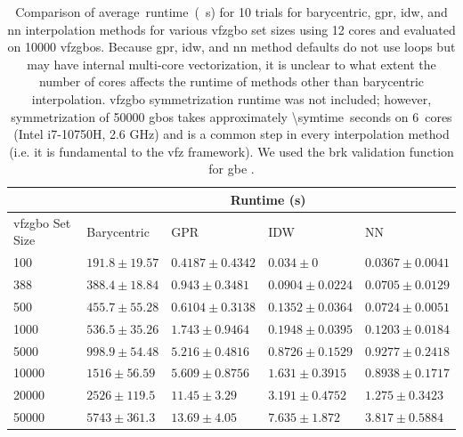 \documentclass[final,twocolumn,12pt]{elsarticle}
\begin{document}
\begin{table}
\centering
\caption{Comparison of average~runtime~(\SI{}{\second}) for \num{10} trials for barycentric, \gls{gpr}, \gls{idw}, and \gls{nn} interpolation methods for various \inpt{} \gls{vfzgbo} set sizes using 12 cores and evaluated on \num{10000} \outpt{} \glspl{vfzgbo}. Because \gls{gpr}, \gls{idw}, and \gls{nn} method defaults do not use  loops but may have internal multi-core vectorization, it is unclear to what extent the number of cores affects the runtime of methods other than barycentric interpolation. \Gls{vfzgbo} symmetrization runtime was not included; however, symmetrization of \num{50000} \glspl{gbo} takes approximately \SI{\symtime}{seconds} on \SI{6}{cores} (Intel i7-10750H, 2.6 GHz) and is a common step in every interpolation method (i.e. it is fundamental to the \gls{vfz} framework). We used the \gls{brk} validation function for \gls{gbe} \cite{bulatovGrainBoundaryEnergy2014}. }
\label{tab:runtime}
\begin{tabular}{lllll}
\cline{2-5}
                    & \multicolumn{4}{c}{Runtime (s)}                                                     \\ \hline
\gls{vfzgbo} Set Size & Barycentric       & GPR                 & IDW                 & NN                  \\ \hline
\num{100}           & $191.8 \pm 19.57$ & $0.4187 \pm 0.4342$ & $0.034 \pm 0$       & $0.0367 \pm 0.0041$ \\
\num{388}           & $388.4 \pm 18.84$ & $0.943 \pm 0.3481$  & $0.0904 \pm 0.0224$ & $0.0705 \pm 0.0129$ \\
\num{500}           & $455.7 \pm 55.28$ & $0.6104 \pm 0.3138$ & $0.1352 \pm 0.0364$ & $0.0724 \pm 0.0051$ \\
\num{1000}          & $536.5 \pm 35.26$ & $1.743 \pm 0.9464$  & $0.1948 \pm 0.0395$ & $0.1203 \pm 0.0184$ \\
\num{5000}          & $998.9 \pm 54.48$ & $5.216 \pm 0.4816$  & $0.8726 \pm 0.1529$ & $0.9277 \pm 0.2418$ \\
\num{10000}         & $1516 \pm 56.59$  & $5.609 \pm 0.8756$  & $1.631 \pm 0.3915$  & $0.8938 \pm 0.1717$ \\
\num{20000}         & $2526 \pm 119.5$  & $11.45 \pm 3.29$    & $3.191 \pm 0.4752$  & $1.275 \pm 0.3423$  \\
\num{50000}         & $5743 \pm 361.3$  & $13.69 \pm 4.05$    & $7.635 \pm 1.872$   & $3.817 \pm 0.5884$  \\ \hline
\end{tabular}
\end{table}
\end{document}
